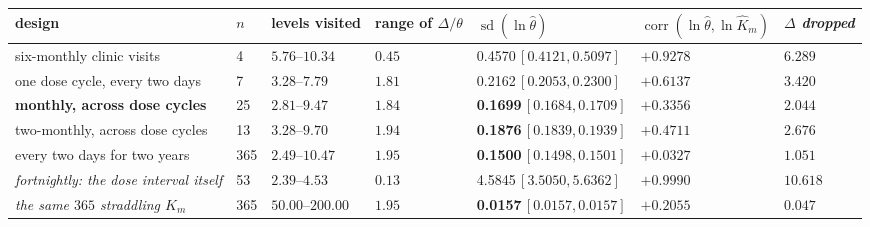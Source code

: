 \begin{tabular}{@{}lllllll@{}}
\toprule
\textbf{design} & \textbf{$n$} & \textbf{levels visited} & \textbf{range of $\Delta/\theta$} & \textbf{$\operatorname{sd}(\ln\hat\theta)$} & \textbf{$\operatorname{corr}(\ln\hat\theta, \ln \hat K_m)$} & \textbf{\emph{$\Delta$ dropped}} \\
\midrule
six-monthly clinic visits & 4 & $5.76$--$10.34$ & $0.45$ & 0.4570\,\scriptsize$[0.4121, 0.5097]$ & $+0.9278$ & $6.289$ \\
one dose cycle, every two days & 7 & $3.28$--$7.79$ & $1.81$ & 0.2162\,\scriptsize$[0.2053, 0.2300]$ & $+0.6137$ & $3.420$ \\
\textbf{monthly, across dose cycles} & 25 & $2.81$--$9.47$ & $1.84$ & \textbf{0.1699}\,\scriptsize$[0.1684, 0.1709]$ & $+0.3356$ & $2.044$ \\
two-monthly, across dose cycles & 13 & $3.28$--$9.70$ & $1.94$ & \textbf{0.1876}\,\scriptsize$[0.1839, 0.1939]$ & $+0.4711$ & $2.676$ \\
every two days for two years & 365 & $2.49$--$10.47$ & $1.95$ & \textbf{0.1500}\,\scriptsize$[0.1498, 0.1501]$ & $+0.0327$ & $1.051$ \\
\emph{fortnightly: the dose interval itself} & 53 & $2.39$--$4.53$ & $0.13$ & 4.5845\,\scriptsize$[3.5050, 5.6362]$ & $+0.9990$ & $10.618$ \\
\emph{the same $365$ straddling $K_m$} & 365 & $50.00$--$200.00$ & $1.95$ & \textbf{0.0157}\,\scriptsize$[0.0157, 0.0157]$ & $+0.2055$ & $0.047$ \\
\bottomrule
\end{tabular}
